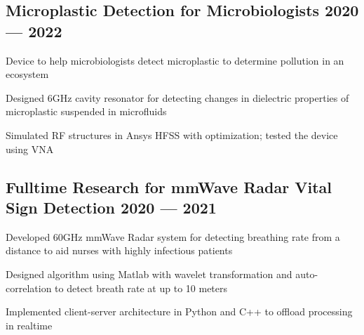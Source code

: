 \documentclass[letter,10pt]{article}
\begin{document}
\subsection{{Microplastic Detection for Microbiologists \hfill 2020 --- 2022}}
\begin{zitemize}
\item Device to help microbiologists detect microplastic to determine pollution in an ecosystem
\item Designed 6GHz cavity resonator for detecting changes in dielectric properties of microplastic suspended in microfluids
\item Simulated RF structures in Ansys HFSS with optimization; tested the device using VNA
\end{zitemize}

\subsection{{Fulltime Research for mmWave Radar Vital Sign Detection \hfill 2020 --- 2021}}
\begin{zitemize}
\item Developed 60GHz mmWave Radar system for detecting breathing rate from a distance to aid nurses with highly infectious patients
\item Designed algorithm using Matlab with wavelet transformation and auto-correlation to detect breath rate at up to 10 meters
\item Implemented client-server architecture in Python and C++ to offload processing in realtime
\end{zitemize}
\end{document}
